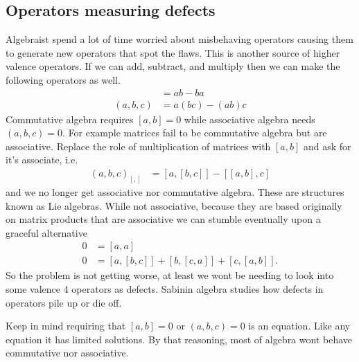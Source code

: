 \subsection{Operators measuring defects}
Algebraist spend a lot of time worried about misbehaving operators 
causing them to generate new operators that spot the flaws.  This is another 
source of higher valence operators. If 
we can add, subtract, and multiply then we can make the following operators as well.
\begin{align*}
    [a,b] & = ab-ba \tag{Commutator}\\
    (a,b,c) & = a(bc)-(ab)c \tag{Associator}
\end{align*}
Commutative algebra requires $[a,b]=0$ while associative algebra needs $(a,b,c)=0$.
For example matrices fail to be commutative algebra but are associative.
Replace the role of multiplication of matrices with $[a,b]$ and ask for it's 
associate, i.e.
\begin{align*}
    (a,b,c)_{[,]} & = [a,[b,c]]-[[a,b],c]
\end{align*}
and we no longer get associative nor commutative algebra.  These are structures 
known as Lie algebras.  While not associative, because they are based originally 
on matrix products that are associative we can stumble eventually upon a 
graceful alternative
\begin{align*}
    0 & = [a,a] \tag{Alternating}\\
    0 & = [a,[b,c]]+[b,[c,a]]+[c,[a,b]].    
    \tag{Jacobi}
\end{align*}
So the problem is not getting worse, at least we wont be needing 
to look into some  valence 4 operators as defects.  Sabinin algebra 
studies how defects in operators pile up or die off.



Keep in mind requiring that $[a,b]=0$ or $(a,b,c)=0$ is an equation. 
Like any equation it has limited solutions.  By that reasoning, 
most of algebra wont behave commutative nor associative.



